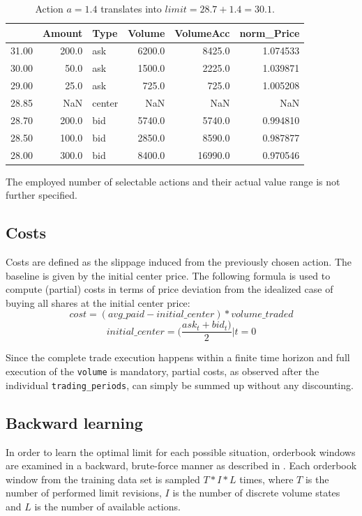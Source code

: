 \begin{table}
\centering
\begin{tabular}{lrlrrr}
\toprule
{} &  Amount &    Type &  Volume &  VolumeAcc &  norm\_Price \\
\midrule
31.00 &   200.0 &     ask &  6200.0 &     8425.0 &    1.074533 \\
30.00 &    50.0 &     ask &  1500.0 &     2225.0 &    1.039871 \\
29.00 &    25.0 &     ask &   725.0 &      725.0 &    1.005208 \\
28.85 &     NaN &  center &     NaN &        NaN &         NaN \\
28.70 &   200.0 &     bid &  5740.0 &     5740.0 &    0.994810 \\
28.50 &   100.0 &     bid &  2850.0 &     8590.0 &    0.987877 \\
28.00 &   300.0 &     bid &  8400.0 &    16990.0 &    0.970546 \\
\bottomrule
\end{tabular}
\caption{Action $a=1.4$ translates into $limit=28.7 + 1.4 = 30.1$.}
\label{table:orderbook:example:again}
\end{table}

The employed number of selectable actions and their actual value range is not further specified.


\subsection{Costs}
\label{chap:costs}
Costs are defined as the slippage induced from the previously chosen action. The baseline is given by the initial center price. The following formula is used to compute (partial) costs in terms of price deviation from the idealized case of buying all shares at the initial center price:
\begin{equation}
   cost = (avg\_paid - initial\_center) * volume\_traded
\end{equation}
\begin{equation}
   initial\_center = (\dfrac{ask_t+bid_t)}{2} | t=0
\end{equation}

Since the complete trade execution happens within a finite time horizon and full execution of the \lstinline!volume! is mandatory, partial costs, as observed after the individual \lstinline!trading_periods!, can simply be summed up without any discounting.


\subsection{Backward learning}
\label{chap:backwardlearning}
In order to learn the optimal limit for each possible situation, orderbook windows are examined in a backward, brute-force manner as described in . Each orderbook window from the training data set is sampled $T*I*L$ times, where $T$ is the number of performed limit revisions, $I$ is the number of discrete volume states and $L$ is the number of available actions.

